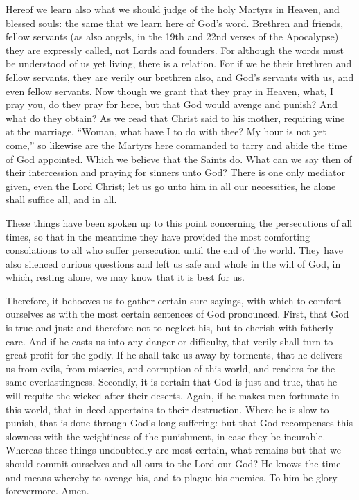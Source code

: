 Hereof we learn also what we should judge of the holy Martyrs in Heaven, and blessed souls: the same that we learn here of God’s word. Brethren and friends, fellow servants (as also angels, in the 19th and 22nd verses of the Apocalypse) they are expressly called, not Lords and founders. For although the words must be understood of us yet living, there is a relation. For if we be their brethren and fellow servants, they are verily our brethren also, and God’s servants with us, and even fellow servants. Now though we grant that they pray in Heaven, what, I pray you, do they pray for here, but that God would avenge and punish? And what do they obtain? As we read that Christ said to his mother, requiring wine at the marriage, “Woman, what have I to do with thee? My hour is not yet come,” so likewise are the Martyrs here commanded to tarry and abide the time of God appointed. Which we believe that the Saints do. What can we say then of their intercession and praying for sinners unto God? There is one only mediator given, even the Lord Christ; let us go unto him in all our necessities, he alone shall suffice all, and in all.

These things have been spoken up to this point concerning the persecutions of all times, so that in the meantime they have provided the most comforting consolations to all who suffer persecution until the end of the world. They have also silenced curious questions and left us safe and whole in the will of God, in which, resting alone, we may know that it is best for us.

Therefore, it behooves us to gather certain sure sayings, with which to comfort ourselves as with the most certain sentences of God pronounced. First, that God is true and just: and therefore not to neglect his, but to cherish with fatherly care. And if he casts us into any danger or difficulty, that verily shall turn to great profit for the godly. If he shall take us away by torments, that he delivers us from evils, from miseries, and corruption of this world, and renders for the same everlastingness. Secondly, it is certain that God is just and true, that he will requite the wicked after their deserts. Again, if he makes men fortunate in this world, that in deed appertains to their destruction. Where he is slow to punish, that is done through God’s long suffering: but that God recompenses this slowness with the weightiness of the punishment, in case they be incurable. Whereas these things undoubtedly are most certain, what remains but that we should commit ourselves and all ours to the Lord our God? He knows the time and means whereby to avenge his, and to plague his enemies. To him be glory forevermore. Amen.
